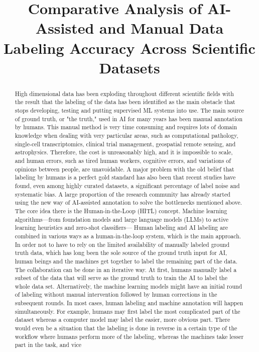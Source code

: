 \documentclass[10pt, conference, letterpaper]{IEEEtran}
\begin{document}
\title{Comparative Analysis of AI-Assisted and Manual Data Labeling Accuracy Across Scientific Datasets}

\author{
}

\maketitle

\begin{abstract}
High dimensional data has been exploding throughout different scientific fields with the result that the labeling of the data has been identified as the main obstacle that stops developing, testing and putting supervised ML systems into use. The main source of ground truth, or "the truth," used in AI for many years has been manual annotation by humans. This manual method is very time consuming and requires lots of domain knowledge when dealing with very particular areas, such as computational pathology, single-cell transcriptomics, clinical trial management, geospatial remote sensing, and astrophysics. Therefore, the cost is unreasonably high, and it is impossible to scale, and human errors, such as tired human workers, cognitive errors, and variations of opinions between people, are unavoidable. A major problem with the old belief that labeling by humans is a perfect gold standard has also been that recent studies have found, even among highly curated datasets, a significant percentage of label noise and systematic bias. A large proportion of the research community has already started using the new way of AI-assisted annotation to solve the bottlenecks mentioned above. The core idea there is the Human-in-the-Loop (HITL) concept. Machine learning algorithms---from foundation models and large language models (LLMs) to active learning heuristics and zero-shot classifiers--- Human labeling and AI labeling are combined in various ways as a human-in-the-loop system, which is the main approach. In order not to have to rely on the limited availability of manually labeled ground truth data, which has long been the sole source of the ground truth input for AI, human beings and the machines get together to label the remaining part of the data. The collaboration can be done in an iterative way. At first, humans manually label a subset of the data that will serve as the ground truth to train the AI to label the whole data set. Alternatively, the machine learning models might have an initial round of labeling without manual intervention followed by human corrections in the subsequent rounds. In most cases, human labeling and machine annotation will happen simultaneously. For example, humans may first label the most complicated part of the dataset whereas a computer model may label the easier, more obvious part. There would even be a situation that the labeling is done in reverse in a certain type of the workflow where humans perform more of the labeling, whereas the machines take lesser part in the task, and vice 
\end{abstract}
\end{document}
